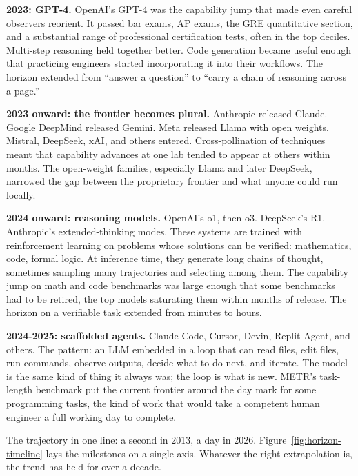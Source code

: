 \textbf{2023: GPT-4.} OpenAI's GPT-4 was the capability jump that made even careful observers reorient. It passed bar exams, AP exams, the GRE quantitative section, and a substantial range of professional certification tests, often in the top deciles. Multi-step reasoning held together better. Code generation became useful enough that practicing engineers started incorporating it into their workflows. The horizon extended from ``answer a question'' to ``carry a chain of reasoning across a page.''

\textbf{2023 onward: the frontier becomes plural.} Anthropic released Claude. Google DeepMind released Gemini. Meta released Llama with open weights. Mistral, DeepSeek, xAI, and others entered. Cross-pollination of techniques meant that capability advances at one lab tended to appear at others within months. The open-weight families, especially Llama and later DeepSeek, narrowed the gap between the proprietary frontier and what anyone could run locally.

\textbf{2024 onward: reasoning models.} OpenAI's o1, then o3. DeepSeek's R1. Anthropic's extended-thinking modes. These systems are trained with reinforcement learning on problems whose solutions can be verified: mathematics, code, formal logic. At inference time, they generate long chains of thought, sometimes sampling many trajectories and selecting among them. The capability jump on math and code benchmarks was large enough that some benchmarks had to be retired, the top models saturating them within months of release. The horizon on a verifiable task extended from minutes to hours.

\textbf{2024-2025: scaffolded agents.} Claude Code, Cursor, Devin, Replit Agent, and others. The pattern: an LLM embedded in a loop that can read files, edit files, run commands, observe outputs, decide what to do next, and iterate. The model is the same kind of thing it always was; the loop is what is new. METR's task-length benchmark put the current frontier around the day mark for some programming tasks, the kind of work that would take a competent human engineer a full working day to complete.

The trajectory in one line: a second in 2013, a day in 2026. Figure~\ref{fig:horizon-timeline} lays the milestones on a single axis. Whatever the right extrapolation is, the trend has held for over a decade.

